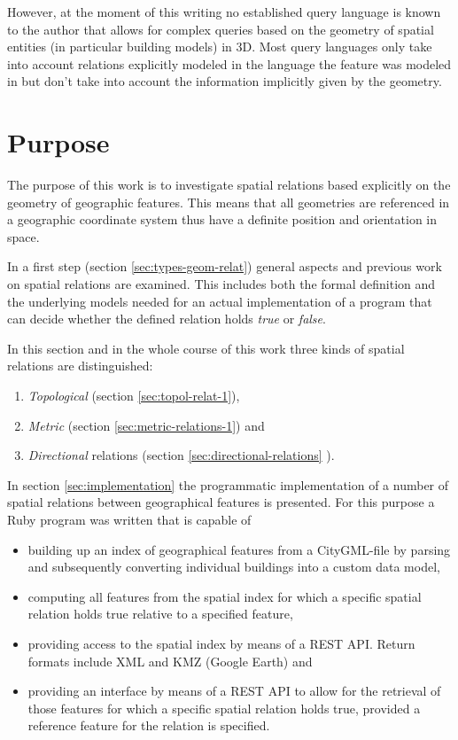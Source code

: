 \documentclass[paper=a4, fontsize=11pt]{scrartcl} %
\numberwithin{equation}{section} %
\numberwithin{figure}{section} %
\numberwithin{table}{section} %
\begin{document}
However, at the moment of this writing no established query language is known to the author that allows for complex queries based on the geometry of spatial entities (in particular building models) in 3D. Most query languages only take into account relations explicitly modeled in the language the feature was modeled in but don't take into account the information implicitly given by the geometry.  

\section{Purpose}
The purpose of this work is to investigate spatial relations based explicitly on the geometry of geographic features. This means that all geometries are referenced in a geographic coordinate system thus have a definite position and orientation in space. 

In a first step (section \ref{sec:types-geom-relat}) general aspects and previous work on spatial relations are examined. This includes both the formal definition and the underlying models needed for an actual implementation of a program that can decide whether the defined relation holds \emph{true} or \emph{false}. 

In this section and in the whole course of this work three kinds of spatial relations are distinguished:
\begin{enumerate}
\item  \emph{Topological} (section \ref{sec:topol-relat-1}),
\item \emph{Metric} (section \ref{sec:metric-relations-1}) and
\item \emph{Directional} relations (section \ref{sec:directional-relations} ).
\end{enumerate}

In section \ref{sec:implementation} the programmatic implementation of a number of spatial relations between geographical features is presented. For this purpose a Ruby program was written that is capable of
\begin{itemize}
\item building up an index of geographical features from a CityGML-file by parsing and subsequently converting individual buildings into a custom data model,
\item computing all features from the spatial index for which a specific spatial relation holds true relative to a specified feature,
\item providing access to the spatial index by means of a REST API. Return formats include XML and KMZ (Google Earth) and 
\item providing an interface by means of a REST API to allow for the retrieval of those features for which a specific spatial relation holds true, provided a reference feature for the relation is specified. \end{itemize}
\end{document}
